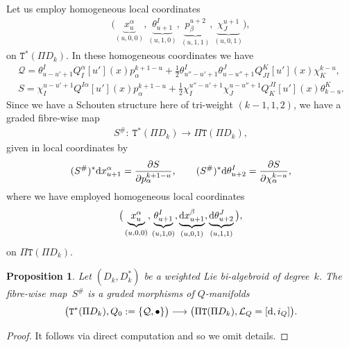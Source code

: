 \documentclass[10pt,a4paper]{amsart}
\newcommand{\rmd}{\textnormal{d}}
\def\sT{{\mathtt T}}
\numberwithin{equation}{section}
\newtheorem{Proposition}[Theorem]{Proposition}
 { \theoremstyle{definition}
\newtheorem{Definition}[Theorem]{Definition}
\newtheorem{Example}[Theorem]{Example}
\newtheorem{Remark}[Theorem]{Remark} }
\begin{document}
Let us employ homogeneous local coordinates
\begin{gather*}
\big( \underbrace{x_{u}^{\alpha}}_{(u,0,0)},  \underbrace{\theta_{u+1}^{I}}_{(u,1,0)},   \underbrace{p_{\beta}^{u+2}}_{(u,1,1)},   \underbrace{\chi_{J}^{u+1}}_{(u,0,1)} \big),
\end{gather*}
on $\sT^{*}(\Pi D_{k})$. In these homogeneous coordinates we have
\begin{gather*}
\mathcal{Q} = \theta_{u-u'+1}^{I} Q_{I}^{\alpha}[u'](x)p_{\alpha}^{k+1-u} + \frac{1}{2} \theta_{u''-u'+1}^{I} \theta_{u-u''+1}^{J}Q_{JI}^{K}[u'](x) \chi_{K}^{k-u},\\
S  = \chi_{I}^{u-u'+1} Q^{I \alpha}[u'](x) p_{\alpha}^{k+1-u} + \frac{1}{2}\chi_{I}^{u''-u'+1}\chi_{J}^{u-u''+1}Q_{K}^{JI}[u'](x)\theta_{k-u}^{K}.
\end{gather*}
Since we have a Schouten structure here of tri-weight $(k-1,1,2)$, we have a graded f\/ibre-wise map
\begin{gather*}
S^{\#} \colon \ \sT^{*}(\Pi D_{k}) \longrightarrow \Pi \sT(\Pi D_{k}),
\end{gather*}
given in local coordinates by
\begin{gather*}
(S^{\#})^{*}\rmd x^{\alpha}_{u+1}  =  \frac{\partial S}{\partial p_{\alpha}^{k+1-u}  }  ,\qquad
  (S^{\#})^{*} \rmd\theta_{u+2}^{I}  =   \frac{\partial S }{\partial \chi_{\alpha}^{k-u}},
\end{gather*}
where we have employed homogeneous local coordinates
\begin{gather*}
\big( \underbrace{x_{u}^{\alpha}}_{(u,0,0)},   \underbrace{\theta_{u+1}^{I}}_{(u,1,0)},   \underbrace{\rmd x^{\beta}_{u+1}}_{(u,0,1)},  \underbrace{\rmd\theta^{J}_{u+2}}_{(u,1,1)} \big),
\end{gather*}
on $\Pi\sT(\Pi D_{k})$.

\begin{Proposition}
Let $(D_{k}, D_{k}^{*})$ be a weighted Lie  bi-algebroid of degree~$k$. The fibre-wise map~$S^{\#}$ is a graded morphisms of $Q$-manifolds
\begin{gather*}
\big(\sT^{*}(\Pi D_{k}),   Q_{0} :=  \{\mathcal{Q} , \bullet \} \big) \longrightarrow \big( \Pi \sT(\Pi D_{k}),   \mathcal{L}_{Q} = [\rmd, i_{Q}] \big).
\end{gather*}
\end{Proposition}

\begin{proof}
It follows via direct computation and so we omit details.
\end{proof}
\end{document}
